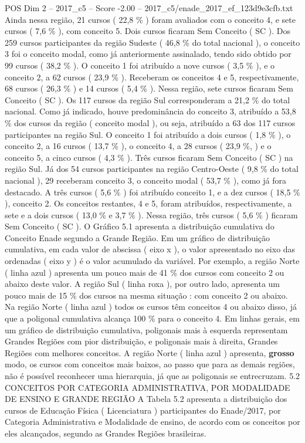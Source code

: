 \begin{textsample}{POS Dim 2 – 2017\_c5 – Score -2.00 – 2017\_c5/enade\_2017\_ef\_123d9e3cfb.txt}
Ainda nessa região, 21 cursos ( 22,8 \% ) foram avaliados com o conceito 4, e sete cursos ( 7,6 \% ), com conceito 5.
Dois cursos ficaram Sem Conceito ( SC ).
Dos 259 cursos participantes da região Sudeste ( 46,8 \% do total nacional ), o conceito 3 foi o conceito modal, como já anteriormente assinalado, tendo sido obtido por 99 cursos ( 38,2 \% ).
O conceito 1 foi atribuído a nove cursos ( 3,5 \% ), e o conceito 2, a 62 cursos ( 23,9 \% ).
Receberam os conceitos 4 e 5, respectivamente, 68 cursos ( 26,3 \% ) e 14 cursos ( 5,4 \% ).
Nessa região, sete cursos ficaram Sem Conceito ( SC ).
Os 117 cursos da região Sul corresponderam a 21,2 \% do total nacional.
Como já indicado, houve predominância do conceito 3, atribuído a 53,8 \% dos cursos da região ( conceito modal ), ou seja, atribuído a 63 dos 117 cursos participantes na região Sul.
O conceito 1 foi atribuído a dois cursos ( 1,8 \% ), o conceito 2, a 16 cursos ( 13,7 \% ), o conceito 4, a 28 cursos ( 23,9 \%, ) e o conceito 5, a cinco cursos ( 4,3 \% ).
Três cursos ficaram Sem Conceito ( SC ) na região Sul.
Já dos 54 cursos participantes na região Centro-Oeste ( 9,8 \% do total nacional ), 29 receberam conceito 3, o conceito modal ( 53,7 \% ), como já fora destacado.
A três cursos ( 5,6 \% ) foi atribuído conceito 1, e a dez cursos ( 18,5 \% ), conceito 2.
Os conceitos restantes, 4 e 5, foram atribuídos, respectivamente, a sete e a dois cursos ( 13,0 \% e 3,7 \% ).
Nessa região, três cursos ( 5,6 \% ) ficaram Sem Conceito ( SC ).
O Gráfico 5.1 apresenta a distribuição cumulativa do Conceito Enade segundo a Grande Região.
Em um gráfico de distribuição cumulativa, em cada valor de abscissa ( eixo x ), o valor apresentado no eixo das ordenadas ( eixo y ) é o valor acumulado da variável.
Por exemplo, a região Norte ( linha azul ) apresenta um pouco mais de 41 \% dos cursos com conceito 2 ou abaixo deste valor.
A região Sul ( linha roxa ), por outro lado, apresenta um pouco mais de 15 \% dos cursos na mesma situação : com conceito 2 ou abaixo.
Na região Norte ( linha azul ) todos os cursos têm conceitos 4 ou abaixo disso, já que a poligonal cumulativa alcança 100 \% para o conceito 4.
Em linhas gerais, em um gráfico de distribuição cumulativa, poligonais mais à esquerda representam Grandes Regiões com pior distribuição, e poligonais mais à direita, Grandes Regiões com melhores conceitos.
A região Norte ( linha azul ) apresenta, \textbf{grosso} modo, os cursos com conceitos mais baixos, ao passo que para as demais regiões, não é possível reconhecer uma hierarquia, já que as poligonais se entrecruzam. 5.2 CONCEITOS POR CATEGORIA ADMINISTRATIVA, POR MODALIDADE DE ENSINO E GRANDE REGIÃO A Tabela 5.2 apresenta a distribuição dos cursos de Educação Física ( Licenciatura ) participantes do Enade/2017, por Categoria Administrativa e Modalidade de ensino, de acordo com os conceitos por eles alcançados, segundo as Grandes Regiões brasileiras.

\end{textsample}
